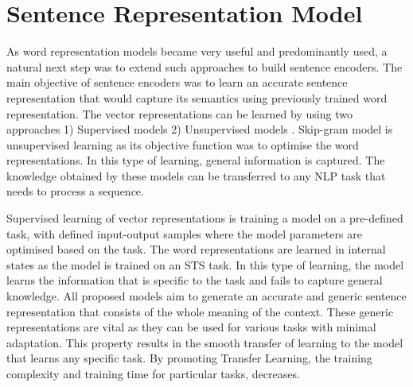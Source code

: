 \documentclass[12pt]{report} %
\begin{document}
\section{Sentence Representation Model}
As word representation models became very useful and predominantly used, a natural next step was to extend such approaches to build sentence encoders. The main objective of sentence encoders was to learn an accurate sentence representation that would capture its semantics using previously trained word representation.
The vector representations can be learned by using two approaches 1) Supervised models \citep{conneau2017supervised} 2) Unsupervised models \citep{kiros2015skip}. Skip-gram model is unsupervised learning as its objective function was to optimise the word representations. In this type of learning, general information is captured. The knowledge obtained by these models can be transferred to any NLP task that needs to process a sequence. 


Supervised learning of vector representations is training a model on a pre-defined task, with defined input-output samples where the model parameters are optimised based on the task. The word representations are learned in internal states as the model is trained on an STS task. In this type of learning, the model learns the information that is specific to the task and fails to capture general knowledge. All proposed models aim to generate an accurate and generic sentence representation that consists of the whole meaning of the context. These generic representations are vital as they can be used for various tasks with minimal adaptation. This property results in the smooth transfer of learning to the model that learns any specific task. By promoting Transfer Learning, the training complexity and training time for particular tasks, decreases.  
\end{document}
